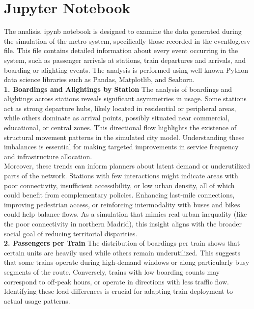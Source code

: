

\chapter*{\center \Large Jupyter Notebook }
The analisis. ipynb notebook is designed to examine the data generated during the simulation of the metro system, specifically those recorded in the eventlog.csv file. This file contains detailed information about every event occurring in the system, such as passenger arrivals at stations, train departures and arrivals, and boarding or alighting events. The analysis is performed using well-known Python data science libraries such as Pandas, Matplotlib, and Seaborn.
~\\[0,5cm]
\noindent\textbf{1. Boardings and Alightings by Station}
The analysis of boardings and alightings across stations reveals significant asymmetries in usage. Some stations act as strong departure hubs, likely located in residential or peripheral areas, while others dominate as arrival points, possibly situated near commercial, educational, or central zones. This directional flow highlights the existence of structural movement patterns in the simulated city model. Understanding these imbalances is essential for making targeted improvements in service frequency and infrastructure allocation.
~\\[0,5cm]
Moreover, these trends can inform planners about latent demand or underutilized parts of the network. Stations with few interactions might indicate areas with poor connectivity, insufficient accessibility, or low urban density, all of which could benefit from complementary policies. Enhancing last-mile connections, improving pedestrian access, or reinforcing intermodality with buses and bikes could help balance flows. As a simulation that mimics real urban inequality (like the poor connectivity in northern Madrid), this insight aligns with the broader social goal of reducing territorial disparities.
~\\[0,5cm]
\noindent\textbf{ 2. Passengers per Train   }
The distribution of boardings per train shows that certain units are heavily used while others remain underutilized. This suggests that some trains operate during high-demand windows or along particularly busy segments of the route. Conversely, trains with low boarding counts may correspond to off-peak hours, or operate in directions with less traffic flow. Identifying these load differences is crucial for adapting train deployment to actual usage patterns.
~\\[0,5cm]
